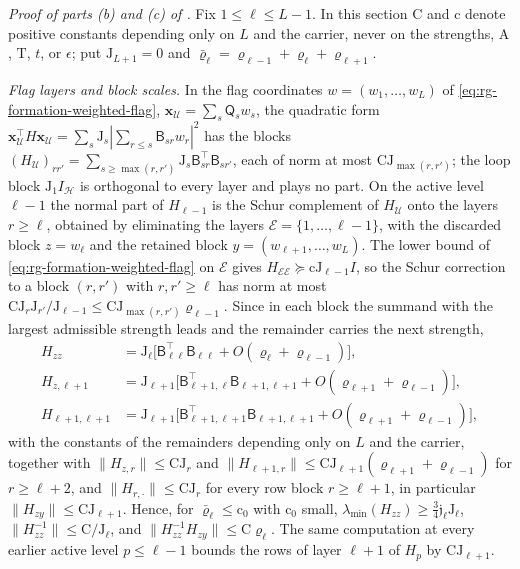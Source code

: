 \noindent\emph{Proof of parts (b) and (c) of .}
Fix \(1\le\ell\le L-1\). In this section \(\mathrm C\) and \(\mathrm c\)
denote positive constants depending only on \(L\) and the carrier, never on
the strengths, \(\mathrm A\), \(\mathrm T\), \(t\), or \(\epsilon\); put
\(\mathrm J_{L+1}=0\) and
\(\bar\varrho_\ell=\varrho_{\ell-1}+\varrho_\ell+\varrho_{\ell+1}\).

\emph{Flag layers and block scales.} In the flag coordinates
\(w=(w_1,\ldots,w_L)\) of \cref{eq:rg-formation-weighted-flag},
\(\mathbf x_{\mathcal U}=\sum_s\mathsf Q_sw_s\), the quadratic form
\(\mathbf x_{\mathcal U}^\top H\mathbf x_{\mathcal U}=\sum_s\mathrm J_s|\sum_{r\le s}\mathsf B_{sr}w_r|^2\)
has the blocks
\((H_{\mathcal U})_{rr'}=\sum_{s\ge\max(r,r')}\mathrm J_s\mathsf B_{sr}^\top\mathsf B_{sr'}\),
each of norm at most \(\mathrm C\mathrm J_{\max(r,r')}\); the loop block
\(\mathrm J_1I_{\mathcal H}\) is orthogonal to every layer and plays no part.
On the active level \(\ell-1\) the normal part of \(H_{\ell-1}\) is the Schur
complement of \(H_{\mathcal U}\) onto the layers \(r\ge\ell\), obtained by
eliminating the layers \(\mathcal E=\{1,\ldots,\ell-1\}\), with the discarded
block \(z=w_\ell\) and the retained block \(y=(w_{\ell+1},\ldots,w_L)\). The
lower bound of \cref{eq:rg-formation-weighted-flag} on \(\mathcal E\) gives
\(H_{\mathcal E\mathcal E}\succeq\mathrm c\mathrm J_{\ell-1}I\), so the Schur
correction to a block \((r,r')\) with \(r,r'\ge\ell\) has norm at most
\(\mathrm C\mathrm J_r\mathrm J_{r'}/\mathrm J_{\ell-1}\le\mathrm C\mathrm J_{\max(r,r')}\varrho_{\ell-1}\).
Since in each block the summand with the largest admissible strength leads
and the remainder carries the next strength,
\begin{equation}
\begin{aligned}
H_{zz}&=\mathrm J_\ell\bigl[\mathsf B_{\ell\ell}^\top\mathsf B_{\ell\ell}+O(\varrho_\ell+\varrho_{\ell-1})\bigr],\\
H_{z,\ell+1}&=\mathrm J_{\ell+1}\bigl[\mathsf B_{\ell+1,\ell}^\top\mathsf B_{\ell+1,\ell+1}+O(\varrho_{\ell+1}+\varrho_{\ell-1})\bigr],\\
H_{\ell+1,\ell+1}&=\mathrm J_{\ell+1}\bigl[\mathsf B_{\ell+1,\ell+1}^\top\mathsf B_{\ell+1,\ell+1}+O(\varrho_{\ell+1}+\varrho_{\ell-1})\bigr],
\end{aligned}
\label{eq:rg-formation-core-block-scales}
\end{equation}
with the constants of the remainders depending only on \(L\) and the carrier,
together with \(\|H_{z,r}\|\le\mathrm C\mathrm J_r\) and
\(\|H_{\ell+1,r}\|\le\mathrm C\mathrm J_{\ell+1}(\varrho_{\ell+1}+\varrho_{\ell-1})\)
for \(r\ge\ell+2\), and \(\|H_{r,\cdot}\|\le\mathrm C\mathrm J_r\) for every
row block \(r\ge\ell+1\), in particular
\(\|H_{zy}\|\le\mathrm C\mathrm J_{\ell+1}\). Hence, for
\(\bar\varrho_\ell\le\mathrm c_0\) with \(\mathrm c_0\) small,
\(\lambda_{\min}(H_{zz})\ge\tfrac34\mathfrak j_\ell\mathrm J_\ell\),
\(\|H_{zz}^{-1}\|\le\mathrm C/\mathrm J_\ell\), and
\(\|H_{zz}^{-1}H_{zy}\|\le\mathrm C\varrho_\ell\). The same computation at
every earlier active level \(p\le\ell-1\) bounds the rows of layer
\(\ell+1\) of \(H_p\) by \(\mathrm C\mathrm J_{\ell+1}\).

